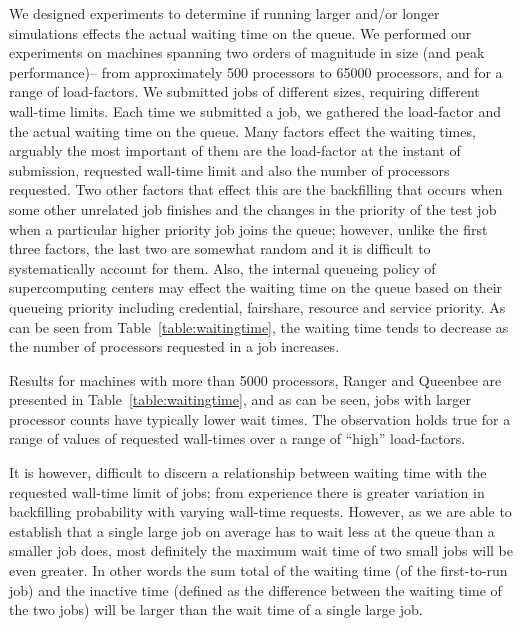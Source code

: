 \documentclass[conference,final]{IEEEtran}
\begin{document}
We designed experiments to determine if running larger and/or longer
simulations effects the actual waiting time on the queue. We performed
our experiments on machines spanning two orders of magnitude in size
(and peak performance)-- from approximately 500 processors to 65000
processors, and for a range of load-factors.  We submitted jobs of
different sizes, requiring different wall-time limits. Each time we
submitted a job, we gathered the load-factor and the actual waiting
time on the queue. Many factors effect the waiting times, arguably the
most important of them are the load-factor at the instant of
submission, requested wall-time limit and also the number of
processors requested. Two other factors that effect this are the
backfilling that occurs when some other unrelated job finishes and the
changes in the priority of the test job when a particular higher
priority job joins the queue; however, unlike the first three factors,
the last two are somewhat random and it is difficult to systematically
account for them. Also, the internal queueing policy of supercomputing
centers may effect the waiting time on the queue based on their
queueing priority including credential, fairshare, resource and
service priority.  As can be seen from Table~\ref{table:waitingtime},
the waiting time tends to decrease as the number of processors
requested in a job increases.



Results for machines with more than 5000 processors, Ranger and
Queenbee are presented in Table~\ref{table:waitingtime}, and as can be
seen, jobs with larger processor counts have typically lower wait
times. The observation holds true for a range of values of requested
wall-times over a range of ``high'' load-factors.


It is however, difficult to discern a relationship between waiting
time with the requested wall-time limit of jobs; from experience there
is greater variation in backfilling probability with varying wall-time
requests.  However, as we are able to establish that a
single large job on average has to wait less at the queue than a
smaller job does, most definitely the maximum wait time of two
small jobs will be even greater. In other words the sum total of the
waiting time (of the first-to-run job) and the inactive time (defined
as the difference between the waiting time of the two jobs) will be
larger than the wait time of a single large job.
\end{document}
